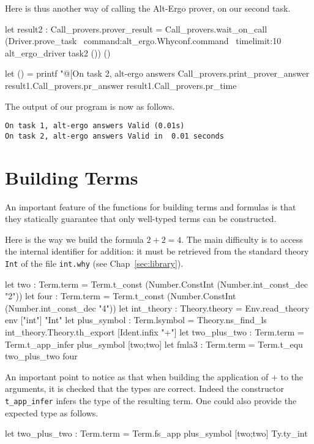Here is thus another way of calling the Alt-Ergo prover, on our second
task.
\begin{ocamlcode}
let result2 : Call_provers.prover_result =
   Call_provers.wait_on_call
    (Driver.prove_task ~command:alt_ergo.Whyconf.command
    ~timelimit:10
    alt_ergo_driver task2 ()) ()

let () =
  printf "@[On task 2, alt-ergo answers %
    Call_provers.print_prover_answer
    result1.Call_provers.pr_answer
    result1.Call_provers.pr_time
\end{ocamlcode}
The output of our program is now as follows.
\begin{verbatim}
On task 1, alt-ergo answers Valid (0.01s)
On task 2, alt-ergo answers Valid in  0.01 seconds
\end{verbatim}

\section{Building Terms}

An important feature of the functions for building terms and formulas
is that they statically guarantee that only well-typed terms can be
constructed.

Here is the way we build the formula $2+2=4$. The main difficulty is to
access the internal identifier for addition: it must be retrieved from
the standard theory \texttt{Int} of the file \texttt{int.why} (see
Chap~\ref{sec:library}).
\begin{ocamlcode}
let two : Term.term =
  Term.t_const (Number.ConstInt (Number.int_const_dec "2"))
let four : Term.term =
  Term.t_const (Number.ConstInt (Number.int_const_dec "4"))
let int_theory : Theory.theory =
  Env.read_theory env ["int"] "Int"
let plus_symbol : Term.lsymbol =
  Theory.ns_find_ls int_theory.Theory.th_export [Ident.infix "+"]
let two_plus_two : Term.term =
  Term.t_app_infer plus_symbol [two;two]
let fmla3 : Term.term = Term.t_equ two_plus_two four
\end{ocamlcode}
An important point to notice as that when building the application of
$+$ to the arguments, it is checked that the types are correct. Indeed
the constructor \texttt{t\_app\_infer} infers the type of the resulting
term. One could also provide the expected type as follows.
\begin{ocamlcode}
let two_plus_two : Term.term =
  Term.fs_app plus_symbol [two;two] Ty.ty_int
\end{ocamlcode}

